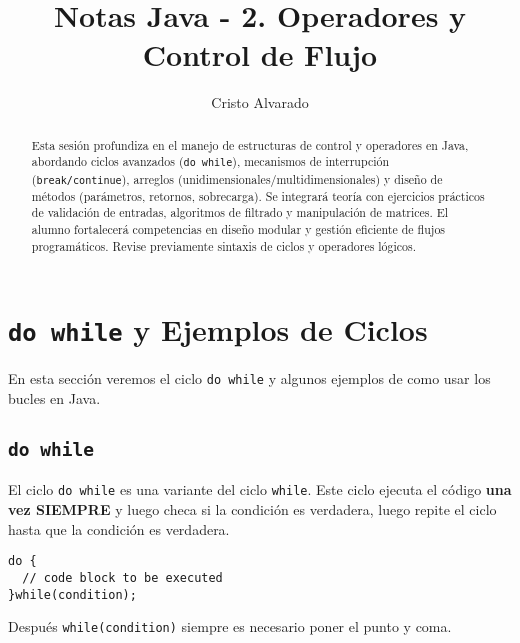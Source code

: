 \documentclass[12pt]{article}
\newcounter{it}
\theoremstyle{largebreak}
\begin{document}
    \setlength{\parskip}{5pt}
    \setlength{\parindent}{12pt}
    \title{Notas Java - 2. Operadores y Control de Flujo}
    \author{Cristo Alvarado}
    \maketitle

    \begin{abstract}
        Esta sesión profundiza en el manejo de estructuras de control y operadores en Java, abordando ciclos avanzados (\texttt{do while}), mecanismos de interrupción (\texttt{break/continue}), arreglos (unidimensionales/multidimensionales) y diseño de métodos (parámetros, retornos, sobrecarga). Se integrará teoría con ejercicios prácticos de validación de entradas, algoritmos de filtrado y manipulación de matrices. El alumno fortalecerá competencias en diseño modular y gestión eficiente de flujos programáticos. Revise previamente sintaxis de ciclos y operadores lógicos.
    \end{abstract}
    
    \tableofcontents

    \lstlistoflistings

    \section{\lstinline|do while| y Ejemplos de Ciclos}

    En esta sección veremos el ciclo \lstinline|do while| y algunos ejemplos de como usar los bucles en Java.

    \subsection{\lstinline|do while|}

    El ciclo \lstinline|do while| es una variante del ciclo \lstinline|while|. Este ciclo ejecuta el código \textbf{una vez SIEMPRE} y luego checa si la condición es verdadera, luego repite el ciclo hasta que la condición es verdadera.

    \begin{lstlisting}[caption={Sintaxis \lstinline|do while|},label=DescriptiveLabel]
do {
  // code block to be executed
}while(condition);
    \end{lstlisting}

    \begin{obs}
        Después \lstinline|while(condition)| siempre es necesario poner el punto y coma.
    \end{obs}
\end{document}
